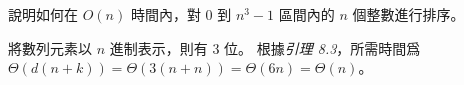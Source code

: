\startEXERCISE
說明如何在 $O(n)$ 時間內，對 $0$ 到 $n^3-1$ 區間內的 $n$ 個整數進行排序。
\stopEXERCISE

\startANSWER
將數列元素以 $n$ 進制表示，則有 3 位。
根據\emph{引理 8.3}，所需時間爲 $\Theta(d(n+k))=\Theta(3(n+n))=\Theta(6n)=\Theta(n)$。
\stopANSWER
